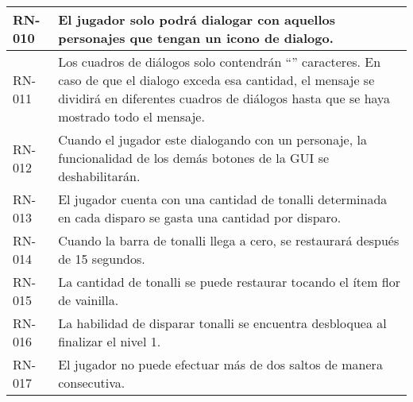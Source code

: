 \begin{longtable}[c]{ | m{5cm} | m{10cm}|}
		RN-010\label{RN:10} & El jugador solo podrá dialogar con aquellos personajes que tengan un icono de dialogo. \\ 
		\hline
		RN-011\label{RN:11} & Los cuadros de diálogos solo contendrán  “” caracteres. En caso de que el dialogo exceda esa cantidad, el mensaje se dividirá en diferentes cuadros de diálogos hasta que se haya mostrado todo el mensaje. \\ 
		\hline
		RN-012\label{RN:12} & Cuando el jugador este dialogando con un personaje, la funcionalidad de los demás botones de la GUI se deshabilitarán.\\ 
		\hline
		RN-013\label{RN:13} & El jugador cuenta con una cantidad de tonalli determinada en cada disparo se gasta una cantidad por disparo.\\ 
		\hline
		RN-014\label{RN:14} & Cuando la barra de tonalli llega a cero, se restaurará después de 15 segundos.\\ 
		\hline
		RN-015\label{RN:15} & La cantidad de tonalli se puede restaurar tocando el ítem flor de vainilla.\\ 
		\hline
		RN-016\label{RN:16} & La habilidad de disparar tonalli se encuentra desbloquea al finalizar el nivel 1.\\ 
		\hline
		RN-017\label{RN:17} & El jugador no puede efectuar más de dos saltos de manera consecutiva.\\ 
		\hline
\end{longtable}